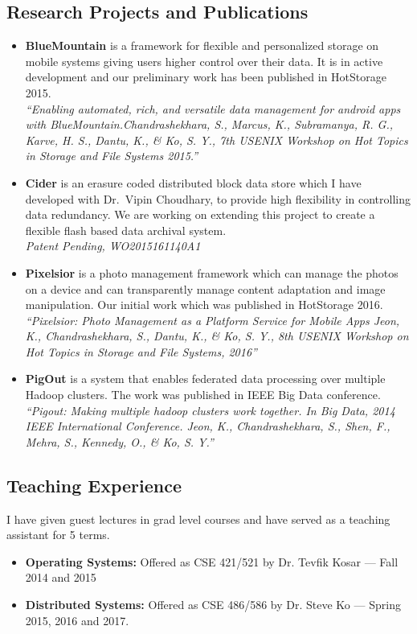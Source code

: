 \documentclass[letterpaper, 11pt]{article}
\begin{document}
	\subsection{Research Projects and Publications}
	\begin{itemize}
		\item \textbf{BlueMountain} is a framework for flexible and personalized
		storage on mobile systems giving users higher control over their data.
		It is in active development and our preliminary work has been published in
		HotStorage 2015.\\
		\emph{``Enabling automated, rich, and versatile data management for
			android apps with BlueMountain.Chandrashekhara, S., Marcus, K.,
			Subramanya, R. G., Karve, H. S., Dantu, K., \& Ko, S. Y.,
			7th USENIX Workshop on Hot Topics in Storage and File Systems 2015.''}
		
		\item \textbf{Cider} is an erasure coded distributed block data store which I
		have developed with Dr.~Vipin Choudhary, to provide high flexibility in
		controlling data
		redundancy. We are working on extending this project to create a flexible
		flash based data archival system.\\
		\emph{Patent Pending, WO2015161140A1}
		
		\item \textbf{Pixelsior} is a photo management framework which can manage
		the photos on a device
		and can transparently manage content adaptation and image manipulation.
		Our initial work which was published in HotStorage 2016.\\
		\emph{``Pixelsior: Photo Management as a Platform Service for Mobile Apps
			Jeon, K., Chandrashekhara, S., Dantu, K., \& Ko, S. Y., 
			8th USENIX Workshop on Hot Topics in Storage and
			File Systems, 2016''}
		
		\item \textbf{PigOut} is a system that enables federated data processing over
		multiple Hadoop clusters. The work was published in IEEE Big Data
		conference.\\
		\emph{``Pigout: Making multiple hadoop clusters work
			together. In Big Data, 2014 IEEE International Conference. Jeon, K.,
			Chandrashekhara, S., Shen, F., Mehra, S.,
			Kennedy, O., \& Ko, S. Y.''}
		
	\end{itemize}
	
	\subsection{Teaching Experience}
	I have given guest lectures
	in grad level courses and have served as a teaching assistant for 5 terms.
	\begin{itemize}
		\item \textbf{Operating Systems: }Offered as CSE 421/521 by Dr. Tevfik Kosar
		--- Fall 2014 and 2015
		\item \textbf{Distributed Systems: }Offered as CSE 486/586 by Dr. Steve
			Ko ---
		Spring 2015, 2016 and 2017.
	\end{itemize}
\end{document}
